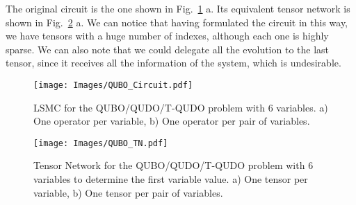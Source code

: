 The original circuit is the one shown in Fig.~\ref{fig: QUBO Circuit} a. Its equivalent tensor network is shown in Fig.~\ref{fig: QUBO TN} a. We can notice that having formulated the circuit in this way, we have tensors with a huge number of indexes, although each one is highly sparse. We can also note that we could delegate all the evolution to the last tensor, since it receives all the information of the system, which is undesirable.
\begin{figure}[h]
    \centering
    \texttt{[image: Images/QUBO\_Circuit.pdf]}
    \caption{LSMC for the QUBO/QUDO/T-QUDO problem with 6 variables. a) One operator per variable, b) One operator per pair of variables.}
    \label{fig: QUBO Circuit}
\end{figure}
\begin{figure}
    \centering
    \texttt{[image: Images/QUBO\_TN.pdf]}
    \caption{Tensor Network for the QUBO/QUDO/T-QUDO problem with 6 variables to determine the first variable value. a) One tensor per variable, b) One tensor per pair of variables.}
    \label{fig: QUBO TN}
\end{figure}

